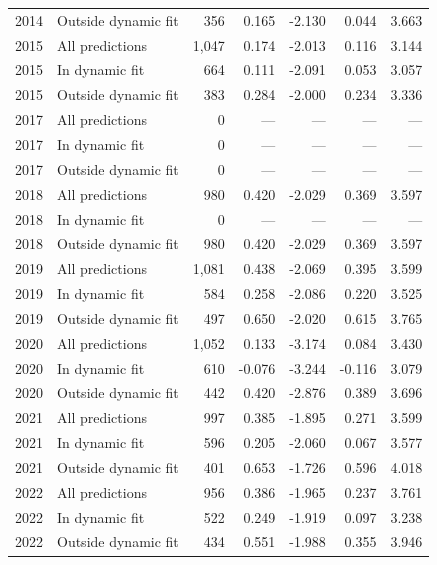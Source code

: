 \begin{longtable}{llrrrrr}
2014 & Outside dynamic fit & 356 & 0.165 & -2.130 & 0.044 & 3.663 \\
2015 & All predictions & 1,047 & 0.174 & -2.013 & 0.116 & 3.144 \\
2015 & In dynamic fit & 664 & 0.111 & -2.091 & 0.053 & 3.057 \\
2015 & Outside dynamic fit & 383 & 0.284 & -2.000 & 0.234 & 3.336 \\
2017 & All predictions & 0 & --- & --- & --- & --- \\
2017 & In dynamic fit & 0 & --- & --- & --- & --- \\
2017 & Outside dynamic fit & 0 & --- & --- & --- & --- \\
2018 & All predictions & 980 & 0.420 & -2.029 & 0.369 & 3.597 \\
2018 & In dynamic fit & 0 & --- & --- & --- & --- \\
2018 & Outside dynamic fit & 980 & 0.420 & -2.029 & 0.369 & 3.597 \\
2019 & All predictions & 1,081 & 0.438 & -2.069 & 0.395 & 3.599 \\
2019 & In dynamic fit & 584 & 0.258 & -2.086 & 0.220 & 3.525 \\
2019 & Outside dynamic fit & 497 & 0.650 & -2.020 & 0.615 & 3.765 \\
2020 & All predictions & 1,052 & 0.133 & -3.174 & 0.084 & 3.430 \\
2020 & In dynamic fit & 610 & -0.076 & -3.244 & -0.116 & 3.079 \\
2020 & Outside dynamic fit & 442 & 0.420 & -2.876 & 0.389 & 3.696 \\
2021 & All predictions & 997 & 0.385 & -1.895 & 0.271 & 3.599 \\
2021 & In dynamic fit & 596 & 0.205 & -2.060 & 0.067 & 3.577 \\
2021 & Outside dynamic fit & 401 & 0.653 & -1.726 & 0.596 & 4.018 \\
2022 & All predictions & 956 & 0.386 & -1.965 & 0.237 & 3.761 \\
2022 & In dynamic fit & 522 & 0.249 & -1.919 & 0.097 & 3.238 \\
2022 & Outside dynamic fit & 434 & 0.551 & -1.988 & 0.355 & 3.946 \\
\end{longtable}
\endgroup
{}
